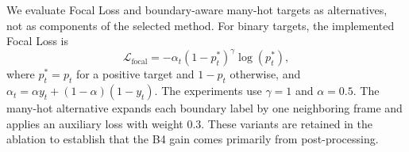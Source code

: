 We evaluate Focal Loss and boundary-aware many-hot targets as alternatives,
not as components of the selected method. For binary targets, the implemented
Focal Loss is
\begin{equation}
    \mathcal{L}_{\mathrm{focal}}
    =-\alpha_t(1-p_t^*)^\gamma\log(p_t^*),
\end{equation}
where $p_t^*=p_t$ for a positive target and $1-p_t$ otherwise, and
$\alpha_t=\alpha y_t+(1-\alpha)(1-y_t)$. The experiments use
$\gamma=1$ and $\alpha=0.5$. The many-hot alternative expands each boundary
label by one neighboring frame and applies an auxiliary loss with weight 0.3.
These variants are retained in the ablation to establish that the B4 gain
comes primarily from post-processing.
